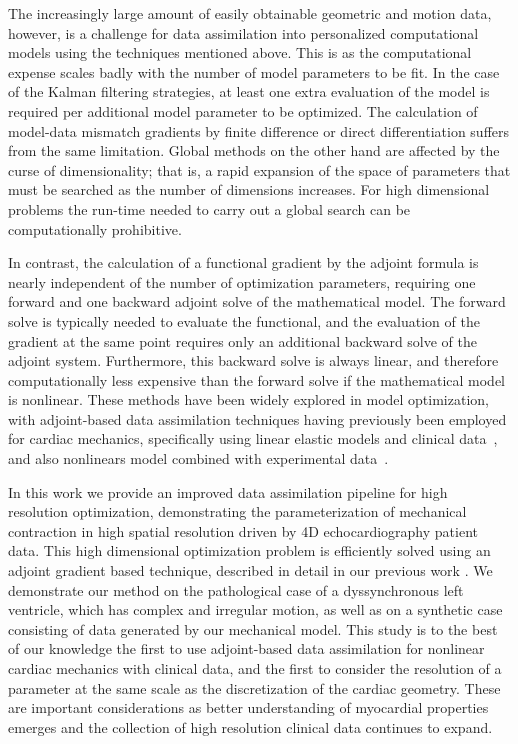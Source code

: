 The increasingly large amount of easily obtainable geometric and motion data, 
however, is a challenge for data assimilation into personalized computational models 
using the techniques mentioned above.  This is as the computational 
expense scales badly with the number of model parameters to be fit. In the 
case of the Kalman filtering strategies, at least one extra evaluation 
of the model is required per additional model parameter to be optimized.
The calculation of model-data mismatch gradients by finite difference 
or direct differentiation suffers from the same limitation. Global methods 
on the other hand are affected by the curse of dimensionality; that is, 
a rapid expansion of the space of parameters that must be searched as the number 
of dimensions increases. For high dimensional problems 
the run-time needed to carry out a global search can be computationally prohibitive.

In contrast, the calculation of a functional gradient by the adjoint formula is 
nearly independent of the number of optimization parameters, requiring one forward and one backward 
adjoint solve of the mathematical model. The forward solve is typically needed to evaluate the functional, 
and the evaluation of the gradient at the same point requires only an additional backward solve of the adjoint system.
Furthermore, this backward solve is always linear, 
and therefore computationally less expensive than the forward solve 
if the mathematical model is nonlinear. These methods have been widely explored in model optimization, 
with adjoint-based data assimilation techniques having previously been
employed for cardiac mechanics, specifically using linear elastic models and
clinical data~\cite{Delingette2012, sundar2009biomechanically}, and
also nonlinears model combined with experimental
data~\cite{balaban2016adjoint}.

In this work we provide an improved data assimilation pipeline for high resolution optimization,
demonstrating the parameterization of mechanical contraction in high spatial resolution 
driven by 4D echocardiography patient data. This high dimensional optimization problem 
is efficiently solved using an adjoint gradient based technique, described in detail 
in our previous work \cite{balaban2016adjoint}. We demonstrate our method on the pathological 
case of a dyssynchronous left ventricle, which has complex and irregular motion, 
as well as on a synthetic case consisting of data generated by our mechanical model. 
This study is to the best of our knowledge the first to use adjoint-based data assimilation 
for nonlinear cardiac mechanics with clinical data, and the first to consider the 
resolution of a parameter at the same scale as the discretization of the cardiac geometry.
These are important considerations as better understanding of myocardial properties 
emerges and the collection of high resolution clinical data continues to expand.

